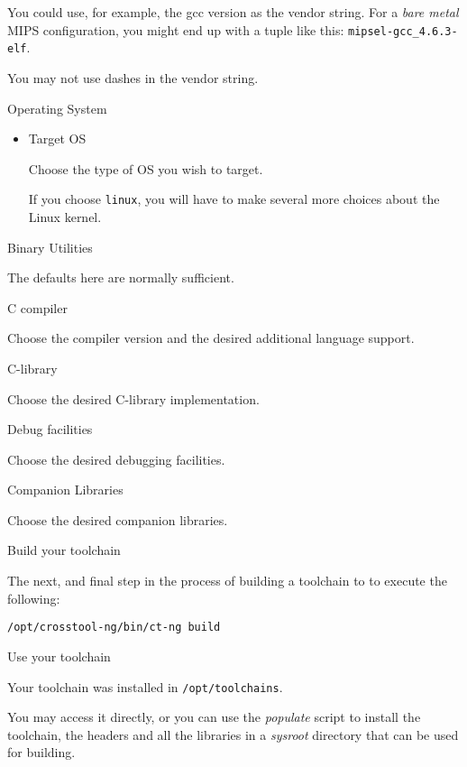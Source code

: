 \begin{description}
\begin{description}
\begin{itemize}
        You could use, for example, the gcc version as the vendor
        string.  For a \emph{bare metal} MIPS configuration, you might
        end up with a tuple like this: \texttt{mipsel-gcc\_4.6.3-elf}.

        You may not use dashes in the vendor string.
      \end{itemize}

    \item{Operating System}
      \begin{itemize}
      \item{Target OS}

        Choose the type of OS you wish to target.

        If you choose \texttt{linux}, you will have to make several
        more choices about the Linux kernel.
      \end{itemize}

    \item{Binary Utilities}

      The defaults here are normally sufficient.

    \item{C compiler}

      Choose the compiler version and the desired additional language
      support.

    \item{C-library}

      Choose the desired C-library implementation.

    \item{Debug facilities}

      Choose the desired debugging facilities.

    \item{Companion Libraries}

      Choose the desired companion libraries.
    \end{description}
  \item Build your toolchain

    The next, and final step in the process of building a toolchain to
    to execute the following:

\begin{verbatim}
/opt/crosstool-ng/bin/ct-ng build
\end{verbatim}

   \item Use your toolchain

     Your toolchain was installed in \texttt{/opt/toolchains}.

     You may access it directly, or you can use the \emph{populate}
     script to install the toolchain, the headers and all the
     libraries in a \emph{sysroot} directory that can be used for
     building.

\end{description}
